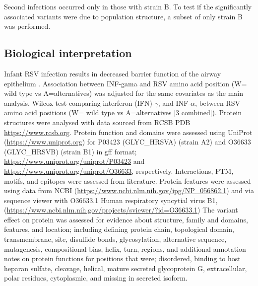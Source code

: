 \documentclass{article}
\begin{document}
Second infections occurred only in those with strain B. 
To test if the significantly associated variants were due to population structure, 
a subset of only strain B was performed. 

\subsection{Biological interpretation}
Infant RSV infection results in decreased barrier function of the airway epithelium
\cite{connelly2021metabolic}.
Association between INF-gama and RSV amino acid position (W= wild type vs A=alternatives) was adjusted for the same covariates as the main analysis. Wilcox test comparing interferon (IFN)-$\gamma$, and INF-$\alpha$, between RSV amino acid positions (W= wild type vs A=alternatives [3 combined]).
Protein structures were analysed with data sourced from 
RCSB PDB \url{https://www.rcsb.org}.
Protein function and domains were assessed using 
UniProt	(\url{https://www.uniprot.org})
for P03423 (GLYC\_HRSVA) (strain A2) and O36633 (GLYC\_HRSVB) (strain B1) in gff format;
\url{https://www.uniprot.org/uniprot/P03423} and
\url{https://www.uniprot.org/uniprot/O36633}, respectively.
Interactions, PTM, motifs, and epitopes were assessed from literature. 
Protein features were assessed using data from NCBI
(\url{https://www.ncbi.nlm.nih.gov/ipg/NP_056862.1}) and
via sequence viewer with O36633.1 Human respiratory syncytial virus B1, 
(\url{https://www.ncbi.nlm.nih.gov/projects/sviewer/?id=O36633.1})
The variant effect on protein was assessed for evidence about structure, family and domains, features, and location; 
including defining protein chain, topological domain, transmembrane, site, disulfide bonds, glycosylation, alternative sequence, mutagenesis, compositional bias, helix, turn, regions, and additional annotation notes on protein functions for positions that were; disordered, binding to host heparan sulfate, cleavage, helical, mature secreted glycoprotein G, extracellular, polar residues, cytoplasmic, and missing in secreted isoform.
\end{document}
